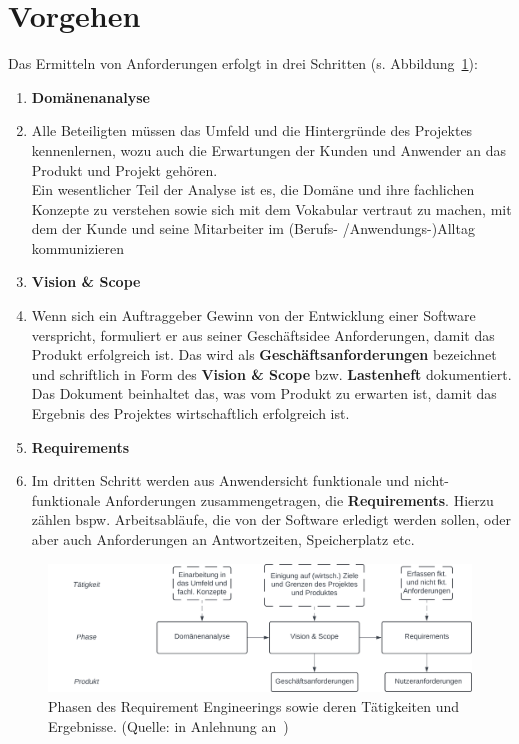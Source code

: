 \section{Vorgehen}

\noindent
Das Ermitteln von Anforderungen erfolgt in drei Schritten (s. Abbildung~\ref{fig:requirementsengineering}):

\begin{enumerate}
    \item \textbf{Domänenanalyse}
    \item[] Alle Beteiligten müssen das Umfeld und die Hintergründe des Projektes kennenlernen, wozu auch die Erwartungen
    der Kunden und Anwender an das Produkt und Projekt gehören.\\
    Ein wesentlicher Teil der Analyse ist es, die Domäne und ihre fachlichen Konzepte zu verstehen sowie sich mit dem Vokabular vertraut zu machen, mit dem der Kunde und seine Mitarbeiter im (Berufs- /Anwendungs-)Alltag kommunizieren
    \item \textbf{Vision \& Scope}
    \item[] Wenn sich ein Auftraggeber Gewinn von der Entwicklung einer Software verspricht, formuliert er aus seiner Geschäftsidee Anforderungen, damit das Produkt erfolgreich ist.
    Das wird als \textbf{Geschäftsanforderungen} bezeichnet und schriftlich in Form des \textbf{Vision \& Scope} bzw. \textbf{Lastenheft} dokumentiert.
    Das Dokument beinhaltet das, was vom Produkt zu erwarten ist, damit das Ergebnis des Projektes wirtschaftlich erfolgreich ist.
    \item \textbf{Requirements}
    \item[] Im dritten Schritt werden aus Anwendersicht funktionale und nicht-funktionale Anforderungen zusammengetragen, die \textbf{Requirements}.
    Hierzu zählen bspw. Arbeitsabläufe, die von der Software erledigt werden sollen, oder aber auch Anforderungen an Antwortzeiten, Speicherplatz etc.
\end{enumerate}



\begin{figure}
    \centering
    \includegraphics[scale=0.35]{part one/Requirements Engineering/img/requirementsengineering}
    \caption{Phasen des Requirement Engineerings sowie deren Tätigkeiten und Ergebnisse. (Quelle: in Anlehnung an~\cite[84]{Wed09})}
    \label{fig:requirementsengineering}
\end{figure}

